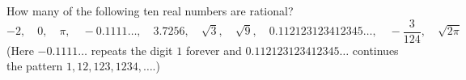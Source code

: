 How many of the following ten real numbers are rational?
\[
-2,\quad 0,\quad \pi,\quad -0.1111\ldots,\quad 3.7256,\quad \sqrt3,\quad \sqrt9,\quad 0.112123123412345\ldots,\quad -\dfrac{3}{124},\quad \sqrt{2\pi}
\]
(Here $-0.1111\ldots$ repeats the digit $1$ forever and $0.112123123412345\ldots$ continues the pattern $1,12,123,1234,\dots$.)
